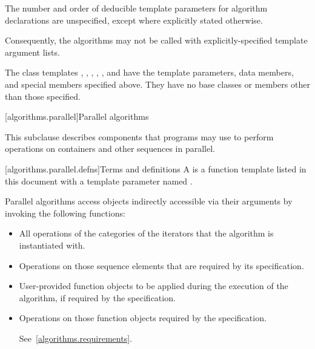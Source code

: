 \pnum
The number and order of deducible template parameters for algorithm declarations
are unspecified, except where explicitly stated otherwise.
\begin{note}
Consequently, the algorithms may not be called with
explicitly-specified template argument lists.
\end{note}

\pnum
The class templates  , ,
, , , and
 have the template parameters, data members, and
special members specified above. They have no base classes or members other than
those specified.

[algorithms.parallel]{Parallel algorithms}

\pnum
This subclause describes components that \Cpp{} programs may use to perform
operations on containers and other sequences in parallel.

[algorithms.parallel.defns]{Terms and definitions}
\pnum
A  is a function template listed in this document with
a template parameter named .

\pnum
Parallel algorithms access objects indirectly accessible via their arguments by
invoking the following functions:

\begin{itemize}
\item
All operations of the categories of the iterators that the algorithm is
instantiated with.

\item
Operations on those sequence elements that are required by its specification.

\item
User-provided function objects to be applied during the execution of the
algorithm, if required by the specification.

\item
Operations on those function objects required by the specification.
\begin{note} See~\ref{algorithms.requirements}.\end{note}
\end{itemize}

